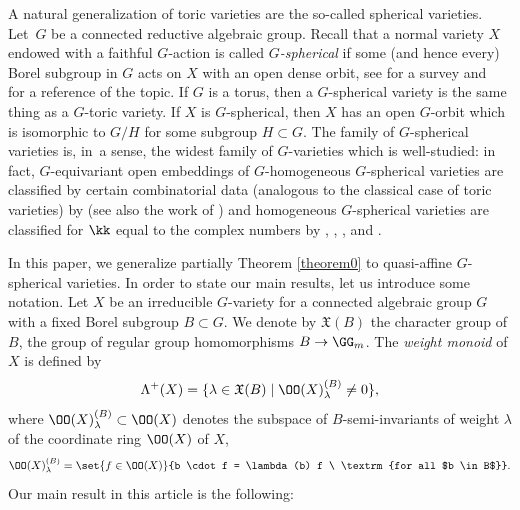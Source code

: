 A natural generalization of toric varieties are the so-called spherical varieties.
Let~$G$ be a connected reductive algebraic group.
Recall that a normal variety $X$ endowed with a faithful $G$-action
is called \emph{$G$-spherical} if some (and hence every)
Borel subgroup in $G$ acts on $X$ with an open dense orbit, see
\eg \cite{Br2010Introduction-to-ac} for a survey
and~\cite{Ti2011Homogeneous-spaces} for a reference of the topic. If $G$ is a torus, then a $G$-spherical variety is the same thing as a $G$-toric variety.
If $X$ is $G$-spherical, then
$X$ has an open $G$-orbit which is isomorphic to $G/H$ for some subgroup $H \subset G$.
The family of $G$-spherical varieties is, in~a sense, the widest family of $G$-varieties which is well-studied: in fact, $G$-equivariant open embeddings of $G$-homogeneous
$G$-spherical varieties are classified
by certain combinatorial data (analogous to the classical case of toric varieties)
by  \cite{LuVu1983Plongements-despac} (see also the work of  \cite{Kn1991The-Luna-Vust-theo})
and homogeneous $G$-spherical varieties are classified for $\kk$ equal to the complex numbers
by , , ,  and 
\cite{Lu2001Varietes-spherique, BrPe2005Wonderful-varietie, Br2007Wonderful-varietie,
Lu2007La-variete-magnifi, Lo2009Uniqueness-propert, BrCu2010Classification-of-, Cu2014Wonderful-Varietie}.

In this paper, we generalize partially Theorem \ref{theorem0} to quasi-affine $G$-spherical varieties.
In order to state our main results, let us introduce some notation. Let
$X$ be an irreducible $G$-variety for a connected algebraic group $G$ with a fixed Borel subgroup
$B \subset G$.
We denote by $\mathfrak{X}(B)$ the character group
of $B$, \ie the group of regular group homomorphisms $B \to \GG_m$.
The \emph{weight monoid} of $X$ is defined by
\[
\Lambda^+(X) = \{\lambda \in \mathfrak{X}(B) \mid \OO(X)_{\lambda}^{(B)} \neq 0\},
\]
where $\OO(X)_{\lambda}^{(B)} \subset \OO(X)$
denotes the subspace of $B$-semi-invariants of weight $\lambda$
of the coordinate ring $\OO(X)$ of $X$, \ie
\[
\OO(X)_{\lambda}^{(B)} = \set{f \in \OO(X)}{b \cdot f = \lambda(b) f \ \textrm{for all $b \in B$}}.
\]
Our main result in this article is the following:

